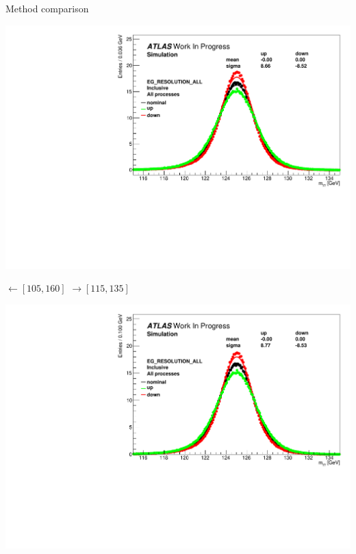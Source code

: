 \documentclass[a4paper]{beamer}
\begin{document}
\begin{frame}{Method comparison}
  \begin{minipage}{0.42\linewidth}
    \includegraphics[width=\linewidth]{plots/h013_EG_RESOLUTION_ALL_0_105160.pdf}
  \end{minipage}
  \hfill
  \begin{minipage}{0.14\linewidth}
    $\leftarrow [105,160]$
    $\rightarrow [115,135]$
    \end{minipage}
  \hfill
  \begin{minipage}{0.42\linewidth}
    \includegraphics[width=\linewidth]{plots/h013_EG_RESOLUTION_ALL_0_115135.pdf}
  \end{minipage}
  \begin{minipage}{0.42\linewidth}

\end{minipage}
\end{frame}
\end{document}
